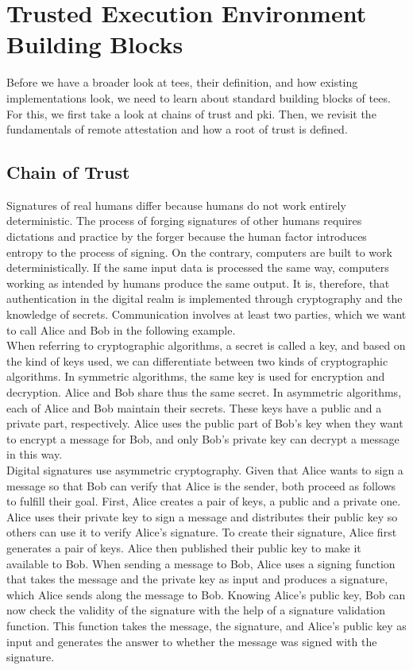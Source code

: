 \section{Trusted Execution Environment Building Blocks}
\label{sec:20:building_blocks}
Before we have a broader look at \glspl{tee}, their definition, and how existing
implementations look, we need to learn about standard building blocks of
\glspl{tee}. For this, we first take a look at chains of trust and \gls{pki}.
Then, we revisit the fundamentals of remote attestation and how a root of
trust is defined.

\subsection{Chain of Trust}
\label{sec:20:chain_of_trust}
Signatures of real humans differ because humans do not work entirely
deterministic. The process of forging signatures of other humans requires
dictations and practice by the forger because the human factor introduces
entropy to the process of signing. On the contrary, computers are built to work
deterministically. If the same input data is processed the same way, computers
working as intended by humans produce the same output. It is, therefore, that
authentication in the digital realm is implemented through cryptography and the
knowledge of secrets. Communication involves at least two parties, which we want
to call Alice and Bob in the following example.\\

When referring to cryptographic algorithms, a secret is called a key, and based
on the kind of keys used, we can differentiate between two kinds of
cryptographic algorithms. In symmetric algorithms, the same key is used for
encryption and decryption. Alice and Bob share thus the same secret. In
asymmetric algorithms, each of Alice and Bob maintain their secrets. These keys
have a public and a private part, respectively. Alice uses the public part of
Bob's key when they want to encrypt a message for Bob, and only Bob's private
key can decrypt a message in this way.\\

Digital signatures use asymmetric cryptography. Given that Alice wants to sign a
message so that Bob can verify that Alice is the sender, both proceed as follows
to fulfill their goal. First, Alice creates a pair of keys, a public and a
private one. Alice uses their private key to sign a message and distributes
their public key so others can use it to verify Alice's signature. To create
their signature, Alice first generates a pair of keys. Alice then published
their public key to make it available to Bob. When sending a message to Bob,
Alice uses a signing function that takes the message and the private key as
input and produces a signature, which Alice sends along the message to Bob.
Knowing Alice's public key, Bob can now check the validity of the signature with
the help of a signature validation function. This function takes the message,
the signature, and Alice's public key as input and generates the answer to
whether the message was signed with the signature.\\

